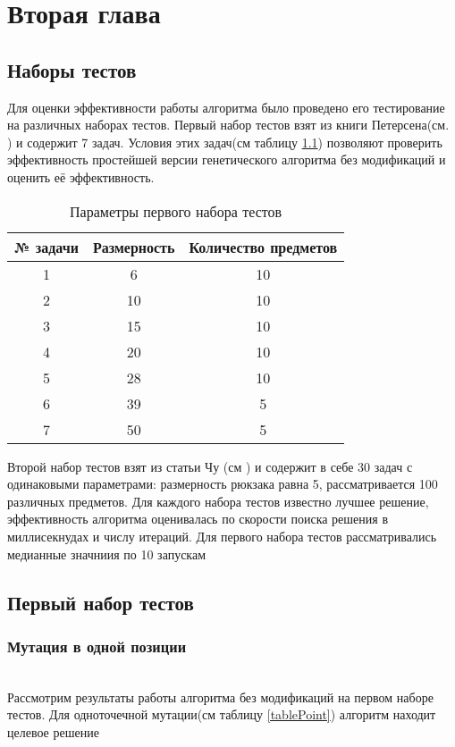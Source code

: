 ﻿\chapter{Вторая глава}

\section{Наборы тестов}

Для оценки эффективности работы алгоритма было проведено его тестирование на различных наборах тестов.
Первый набор тестов взят из книги Петерсена(см. \cite{Петерсен1967}) и содержит 7 задач. Условия этих задач(см таблицу \ref{table1}) позволяют проверить эффективность простейшей версии генетического алгоритма без модификаций и оценить её эффективность. %

\begin{table}[ht]%
\centering
\caption{Параметры первого набора тестов}
\label{table1}
\begin{tabular}{|c|c|c|}
\hline
№ задачи & Размерность & Количество предметов \\ \hline
1        & 6           & 10                   \\ \hline
2        & 10          & 10                   \\ \hline
3        & 15          & 10                   \\ \hline
4        & 20          & 10                   \\ \hline
5        & 28          & 10                   \\ \hline
6        & 39          & 5                    \\ \hline
7        & 50          & 5                    \\ \hline
\end{tabular}
\end{table}  
Второй набор тестов взят из статьи Чу (см \cite{Чу1998}) и содержит в себе 30 задач с одинаковыми параметрами: размерность рюкзака равна 5, рассматривается 100 различных предметов.
Для каждого набора тестов известно лучшее решение, эффективность алгоритма оценивалась по скорости поиска решения в миллисекнудах и числу итераций. Для первого набора тестов рассматривались медианные значниия по 10 запускам 
\section{Первый набор тестов}
\subsection{Мутация в одной позиции}
\\Рассмотрим результаты работы алгоритма без модификаций на первом наборе тестов. Для одноточечной мутации(см таблицу \ref{tablePoint}) алгоритм находит целевое решение 

